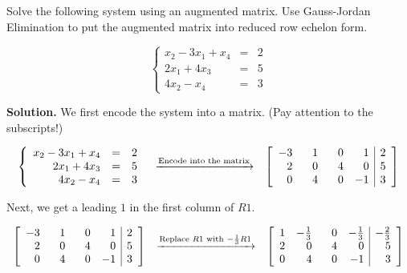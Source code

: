 \documentclass{ximera}
\begin{document}
\begin{example}  Solve the following system using an augmented matrix.  Use Gauss-Jordan Elimination to put the augmented matrix into reduced row echelon form.  

\[\left \{ \begin{array}{rcr} 
x_2 - 3x_1 + x_4 & = & 2 \\ 
2x_1 + 4x_3 & = & 5 \\ 
4x_2-x_4 & = & 3  \end{array} \right.\]

{\bf Solution.} We first encode the system into a matrix.  (Pay attention to the subscripts!)

\[ \begin{array}{ccc}

\left\{ \begin{array}{rcr} 
x_2 - 3x_1 + x_4 & = & 2 \\ 
2x_1 + 4x_3 & = & 5 \\ 
4x_2-x_4 & = & 3  \end{array} \right.

&

\xrightarrow{\text{Encode into the matrix}}

&

 \left[ \begin{array}{rrrr|r}
 -3 & \hphantom{-}1 & \hphantom{-}0 & 1 & 2 \\
 2 & 0 & 4 & 0 & 5 \\
 0 & 4 & 0 & -1 & 3 \\ \end{array} \right]

 \end{array}\]
 
 Next, we get a leading $1$ in the first column of $R1$.

\[ \begin{array}{ccc}

 \left[ \begin{array}{rrrr|r}
 -3 & \hphantom{-}1 & \hphantom{-}0 & 1 & 2 \\
 2 & 0 & 4 & 0 & 5 \\
  0 & 4 & 0 & -1 & 3 \\  \end{array} \right]
&

\xrightarrow{\text{Replace $R1$ with $-\frac{1}{3}R1$}}

&

 \left[ \begin{array}{rrrr|r}
 1 & -\frac{1}{3} & \hphantom{-}0 & -\frac{1}{3} & -\frac{2}{3} \\
 2 & 0 & 4 & 0 & 5 \\
 0 & 4 & 0 & -1 & 3 \\  \end{array} \right]


\end{array}\]
\end{example}
\end{document}
